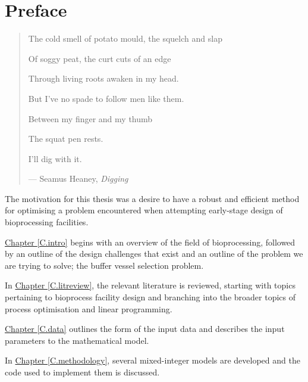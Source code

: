 %
%
%
%

\chapter*{Preface}

\begin{quote}
The cold smell of potato mould, the squelch and slap

Of soggy peat, the curt cuts of an edge

Through living roots awaken in my head.

But I've no spade to follow men like them.

Between my finger and my thumb

The squat pen rests.

I'll dig with it.

\hspace{2cm}--- Seamus Heaney, \emph{Digging}
\end{quote}

The motivation for this thesis was a desire to have a robust and efficient
method for optimising a problem encountered when attempting early-stage
design of bioprocessing facilities. 

\hyperref[C.intro]{Chapter \ref*{C.intro}} begins with an overview of the
field of bioprocessing, followed by an outline of the design challenges that
exist and an outline of the problem we are trying to solve; the buffer vessel
selection problem.

In \hyperref[C.litreview]{Chapter \ref*{C.litreview}}, the relevant literature
is reviewed, starting with topics pertaining to bioprocess facility design and
branching into the broader topics of process optimisation and linear
programming.

\hyperref[C.data]{Chapter \ref*{C.data}} outlines the form of the input data
and describes the input parameters to the mathematical model.

In \hyperref[C.methodology]{Chapter \ref*{C.methodology}}, several
mixed-integer models are developed and the code used to implement them is
discussed.


